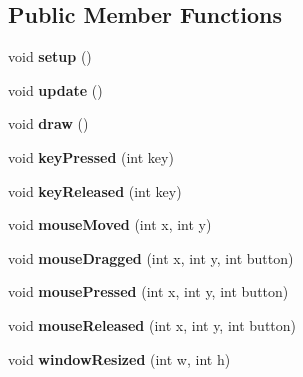 \subsection*{Public Member Functions}
\begin{DoxyCompactItemize}
\item 
\hypertarget{classof_app_af68eaa1366244f7a541cd08e02199c12}{}void {\bfseries setup} ()\label{classof_app_af68eaa1366244f7a541cd08e02199c12}

\item 
\hypertarget{classof_app_afef41ea4aee5a22ea530afba33ae7a7b}{}void {\bfseries update} ()\label{classof_app_afef41ea4aee5a22ea530afba33ae7a7b}

\item 
\hypertarget{classof_app_a75dd45437b9e317db73d8daef1ad49f8}{}void {\bfseries draw} ()\label{classof_app_a75dd45437b9e317db73d8daef1ad49f8}

\item 
\hypertarget{classof_app_a957d3197364bbac8e67eaa4f15b28ad3}{}void {\bfseries key\+Pressed} (int key)\label{classof_app_a957d3197364bbac8e67eaa4f15b28ad3}

\item 
\hypertarget{classof_app_aa1503a87453bcfdd395fe4acca5d91a0}{}void {\bfseries key\+Released} (int key)\label{classof_app_aa1503a87453bcfdd395fe4acca5d91a0}

\item 
\hypertarget{classof_app_a158b41a606310db4633fdb817b21047c}{}void {\bfseries mouse\+Moved} (int x, int y)\label{classof_app_a158b41a606310db4633fdb817b21047c}

\item 
\hypertarget{classof_app_a1ec53d1be799dc275806ff6c6548cd83}{}void {\bfseries mouse\+Dragged} (int x, int y, int button)\label{classof_app_a1ec53d1be799dc275806ff6c6548cd83}

\item 
\hypertarget{classof_app_a2c2ea9c160231e55424dfd98466ef27d}{}void {\bfseries mouse\+Pressed} (int x, int y, int button)\label{classof_app_a2c2ea9c160231e55424dfd98466ef27d}

\item 
\hypertarget{classof_app_aa3131f1554fc49eaa9ee0f284e48129b}{}void {\bfseries mouse\+Released} (int x, int y, int button)\label{classof_app_aa3131f1554fc49eaa9ee0f284e48129b}

\item 
\hypertarget{classof_app_ae4dc1ec1513dcbe48bc78a5e4c3fac0f}{}void {\bfseries window\+Resized} (int w, int h)\label{classof_app_ae4dc1ec1513dcbe48bc78a5e4c3fac0f}


\end{DoxyCompactItemize}
